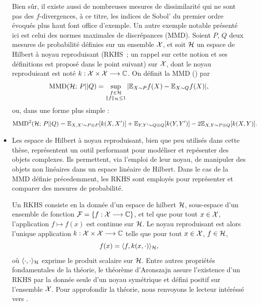 \begin{itemize}
    Bien sûr, il existe aussi de nombreuses mesures de dissimilarité qui ne sont pas des $f$-divergences, à ce titre, les indices de Sobol' du premier ordre évoqués plus haut font office d'exemple. Un autre exemple notable présenté ici est celui des normes maximales de discrépances (MMD). Soient $P$, $Q$ deux mesures de probabilité définies sur un ensemble $\mathcal{X}$, et soit $\mathcal{H}$ un espace de Hilbert à noyau reproduisant (RKHS~; un rappel sur cette notion et ses définitions est proposé dans le point suivant) sur $\mathcal{X}$,  dont le noyau reproduisant est noté $k:\mathcal{X}\times\mathcal{X}\longrightarrow\mathbb{C}$. %
    On définit la MMD (\cite{gretton_kernel_2012}) par
        \begin{equation}
            \text{MMD}(\mathcal{H};\,P||Q) = \sup_{\substack{f\in\mathcal{H}\\ \|f\|_{\mathcal{H}}\leq1}} |\mathbb{E}_{X\sim P}f(X) - \mathbb{E}_{X\sim Q}f(X)|,
        \end{equation}
    ou, dans une forme plus simple :
        \begin{equation}
            \text{MMD}^2(\mathcal{H};\,P||Q) = \mathbb{E}_{X,X'\sim P\otimes P}[k(X,X')] + \mathbb{E}_{Y,Y'\sim Q\otimes Q}[k(Y,Y')] - 2\mathbb{E}_{X,Y\sim P\otimes Q}[k(X,Y)].
        \end{equation}

    \item Les espace de Hilbert à noyau reproduisant, bien que peu utilisés dans cette thèse, représentent un outil performant 
   pour modéliser et repésenter des objets complexes.
   Ils permettent, via l'emploi de leur noyau, de manipuler des objets non linéaires dans un espace linéaire de Hilbert.
        Dans le cas de la MMD définie précedemment, les RKHS sont employés pour représenter et comparer des mesures de probabilité.

        Un RKHS consiste en la donnée d'un espace de hilbert $\mathcal{H}$, sous-espace d'un ensemble de fonction $\mathcal{F}=\{f:\mathcal{X}\longrightarrow\mathbb{C}\}$, et tel que pour tout $x\in\mathcal{X}$, l'application $f\mapsto f(x)$ est continue sur $\mathcal{H}$.
        Le noyau reproduisant est alors l'unique application $k:\mathcal{X}\times\mathcal{X}\longrightarrow\mathbb{C}$ telle que pour tout $x\in\mathcal{X}$, $f\in\mathcal{H}$, 
            \begin{equation}
                f(x)= \langle f,k(x,\cdot) \rangle_{\mathcal{H}},
            \end{equation}
        où $\langle\cdot,\cdot\rangle_{\mathcal{H}}$ exprime le produit scalaire sur $\mathcal{H}$. %
        Entre autres propriétés fondamentales de la théorie, le théorème d'Aronszajn \citep{aronszajn_theory_1950} assure l'existence d'un RKHS par la donnée seule d'un noyau symétrique et défini positif sur l'ensemble $\mathcal{X}$. Pour approfondir la théorie, nous renvoyons le lecteur intéréssé vers \cite{scholkopf_learning_2001}.
        

\end{itemize}
